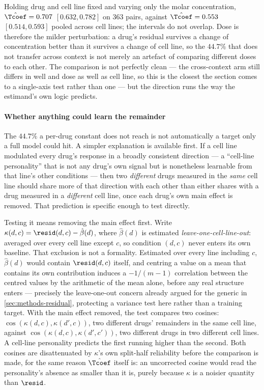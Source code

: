 Holding drug and cell line fixed and varying only the molar concentration,
$\hat{\Tcoef} = 0.707$ $[0.632, 0.782]$ on $\num{363}$ pairs, against
$\hat{\Tcoef} = 0.553$ $[0.514, 0.593]$ pooled across cell lines; the intervals
do not overlap. Dose is therefore the milder perturbation: a drug's residual
survives a change of concentration better than it survives a change of cell
line, so the $44.7\%$ that does not transfer across context is not merely an
artefact of comparing different doses to each other. The comparison is not
perfectly clean --- the cross-context arm still differs in well and dose as well
as cell line, so this is the closest the section comes to a single-axis test
rather than one --- but the direction runs the way the estimand's own logic
predicts.


 
\paragraph{Whether anything could learn the remainder} The $44.7\%$ a per-drug
constant does not reach is not automatically a target only a full model could
hit. A simpler explanation is available first. If a cell line modulated every
drug's response in a broadly consistent direction --- a ``cell-line
personality'' that is not any drug's own signal but is nonetheless learnable
from that line's other conditions --- then two \emph{different} drugs measured
in the \emph{same} cell line should share more of that direction with each
other than either shares with a drug measured in a \emph{different} cell line,
once each drug's own main effect is removed. That prediction is specific enough
to test directly.

Testing it means removing the main effect first. Write
$\kappa(d,c) = \resid(d,c) - \hat{\beta}(d)$, where $\hat\beta(d)$ is estimated
\emph{leave-one-cell-line-out}: averaged over every cell line except $c$, so
condition $(d,c)$ never enters its own baseline. That exclusion is not a
formality. Estimated over every line including $c$, $\hat\beta(d)$ would
contain $\resid(d,c)$ itself, and centring a value on a mean that contains its
own contribution induces a $-1/(m-1)$ correlation between the centred values by
the arithmetic of the mean alone, before any real structure enters ---
precisely the leave-one-out concern already argued for the generic in
\cref{sec:methods-residual}, protecting a variance test here rather than a
training target. With the main effect removed, the test compares two cosines:
$\cos(\kappa(d,c), \kappa(d',c))$, two different drugs' remainders in the same
cell line, against $\cos(\kappa(d,c), \kappa(d',c'))$, two different drugs in
two different cell lines. A cell-line personality predicts the first running
higher than the second. Both cosines are disattenuated by $\kappa$'s own
split-half reliability before the comparison is made, for the same reason
$\hat{\Tcoef}$ itself is: an uncorrected cosine would read the personality's
absence as smaller than it is, purely because $\kappa$ is a noisier quantity
than $\resid$.

